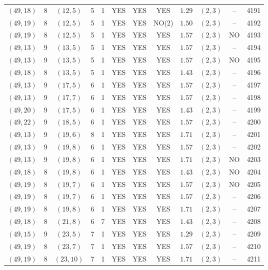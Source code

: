 \begin{longtable}{|c|c|c|c|c|c|c|c|c|c|c|c|}
$(49,18)$ & 8 & $(12,5)$ & 5 & 1 & YES & YES & YES & $1.29$ & $(2,3)$ & -- & 4191\\
$(49,19)$ & 8 & $(12,5)$ & 5 & 1 & YES & YES & NO(2) & $1.50$ & $(2,3)$ & -- & 4192\\
$(49,19)$ & 8 & $(12,5)$ & 5 & 1 & YES & YES & YES & $1.57$ & $(2,3)$ & NO & 4193\\
$(49,13)$ & 9 & $(13,5)$ & 5 & 1 & YES & YES & YES & $1.57$ & $(2,3)$ & -- & 4194\\
$(49,13)$ & 9 & $(13,5)$ & 5 & 1 & YES & YES & YES & $1.57$ & $(2,3)$ & NO & 4195\\
$(49,18)$ & 8 & $(13,5)$ & 5 & 1 & YES & YES & YES & $1.43$ & $(2,3)$ & -- & 4196\\
$(49,13)$ & 9 & $(17,5)$ & 6 & 1 & YES & YES & YES & $1.57$ & $(2,3)$ & -- & 4197\\
$(49,13)$ & 9 & $(17,7)$ & 6 & 1 & YES & YES & YES & $1.57$ & $(2,3)$ & -- & 4198\\
$(49,20)$ & 9 & $(17,5)$ & 6 & 1 & YES & YES & YES & $1.43$ & $(2,3)$ & -- & 4199\\
$(49,22)$ & 9 & $(18,5)$ & 6 & 1 & YES & YES & YES & $1.57$ & $(2,3)$ & -- & 4200\\
$(49,13)$ & 9 & $(19,6)$ & 8 & 1 & YES & YES & YES & $1.71$ & $(2,3)$ & -- & 4201\\
$(49,13)$ & 9 & $(19,8)$ & 6 & 1 & YES & YES & YES & $1.57$ & $(2,3)$ & -- & 4202\\
$(49,13)$ & 9 & $(19,8)$ & 6 & 1 & YES & YES & YES & $1.71$ & $(2,3)$ & NO & 4203\\
$(49,18)$ & 8 & $(19,8)$ & 6 & 1 & YES & YES & YES & $1.43$ & $(2,3)$ & NO & 4204\\
$(49,19)$ & 8 & $(19,7)$ & 6 & 1 & YES & YES & YES & $1.57$ & $(2,3)$ & NO & 4205\\
$(49,19)$ & 8 & $(19,7)$ & 6 & 1 & YES & YES & YES & $1.57$ & $(2,3)$ & -- & 4206\\
$(49,19)$ & 8 & $(19,8)$ & 6 & 1 & YES & YES & YES & $1.71$ & $(2,3)$ & -- & 4207\\
$(49,18)$ & 8 & $(21,8)$ & 6 & 7 & YES & YES & YES & $1.43$ & $(2,3)$ & -- & 4208\\
$(49,15)$ & 9 & $(23,5)$ & 7 & 1 & YES & YES & YES & $1.29$ & $(2,3)$ & -- & 4209\\
$(49,19)$ & 8 & $(23,7)$ & 7 & 1 & YES & YES & YES & $1.57$ & $(2,3)$ & -- & 4210\\
$(49,19)$ & 8 & $(23,10)$ & 7 & 1 & YES & YES & YES & $1.71$ & $(2,3)$ & -- & 4211\\

\end{longtable}
